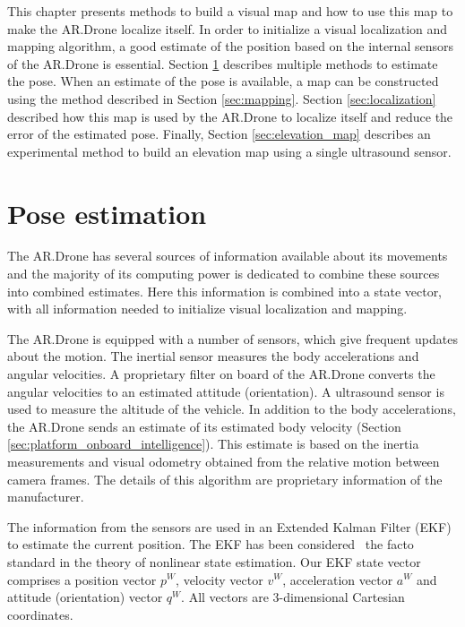 This chapter presents methods to build a visual map and how to use this map to make the AR.Drone localize itself.
In order to initialize a visual localization and mapping algorithm, a good estimate of the position based on the internal sensors of the AR.Drone is essential.
Section \ref{sec:pose_estimation} describes multiple methods to estimate the pose.
When an estimate of the pose is available, a map can be constructed using the method described in Section \ref{sec:mapping}.
Section \ref{sec:localization} described how this map is used by the AR.Drone to localize itself and reduce the error of the estimated pose.
Finally, Section \ref{sec:elevation_map} describes an experimental method to build an elevation map using a single ultrasound sensor.

	\section{Pose estimation}
	\label{sec:pose_estimation}
The AR.Drone has several sources of information available about its movements and the majority of its computing power is dedicated to combine these sources into combined estimates. Here this information is combined into a state vector, with all information needed to initialize visual localization and mapping.

The AR.Drone is equipped with a number of sensors, which give frequent updates about the motion. 
The inertial sensor measures the body accelerations and angular velocities.
A proprietary filter on board of the AR.Drone converts the angular velocities to an estimated attitude (orientation).
A ultrasound sensor is used to measure the altitude of the vehicle.
In addition to the body accelerations, the AR.Drone sends an estimate of its estimated body velocity (Section \ref{sec:platform_onboard_intelligence}).
This estimate is based on the inertia measurements and visual odometry obtained from the relative motion between camera frames.
The details of this algorithm are proprietary information of the manufacturer. 

The information from the sensors are used in an Extended Kalman Filter (EKF) to estimate the current position.
The EKF has been considered~\cite{julier2004unscented} the facto standard in the theory of nonlinear state estimation.
Our EKF state vector comprises a position vector $p^{W}$, velocity vector $v^{W}$, acceleration vector $a^{W}$ and attitude (orientation) vector $q^{W}$.
All vectors are 3-dimensional Cartesian coordinates.

